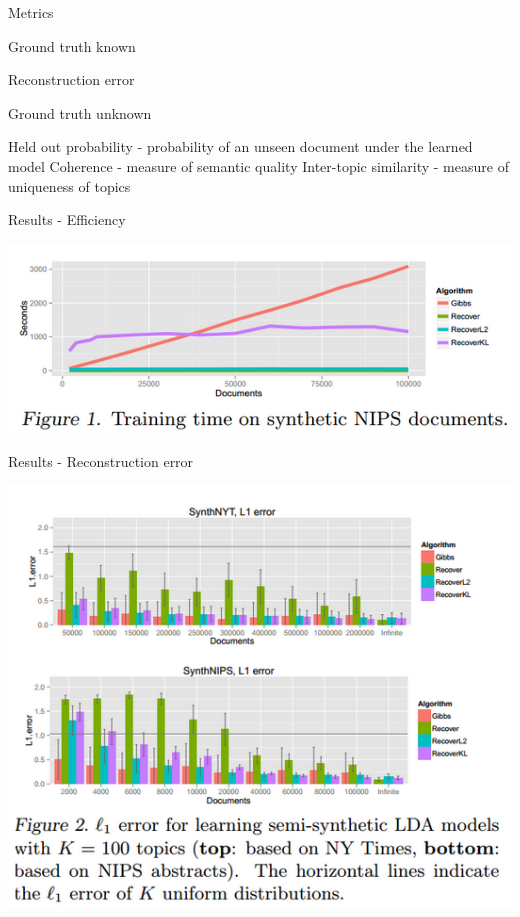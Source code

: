 \documentclass{lecture}
\begin{document}
\begin{plain}{Metrics}
\begin{itemize}
\p Ground truth known
\begin{itemize}
\p Reconstruction error
\end{itemize}
\p Ground truth unknown
\begin{itemize}
\p Held out probability - probability of an unseen document under the learned model
\p Coherence - measure of semantic quality
\p Inter-topic similarity - measure of uniqueness of topics
\end{itemize}
\end{itemize}


\end{plain}


\begin{plain}{Results - Efficiency}
\begin{center}
\includegraphics[scale=0.7]{figs/results_fig1}
\end{center}
\end{plain}

\begin{plain}{Results - Reconstruction error}
\begin{center}
\includegraphics[scale=0.58]{figs/results_fig2}
\end{center}
\end{plain}
\end{document}
